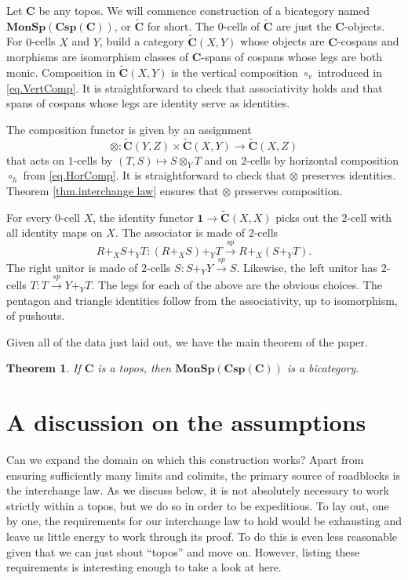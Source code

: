 \documentclass[11pt]{amsart}
\newcommand{\cat}[1]{\mathbf{#1}}
\newcommand{\from}{\colon}
\renewcommand{\span}{\xrightarrow{\mathit{sp}}}
\newcommand{\csC}{\widetilde{\mathbf{C}}}
\newtheorem{thm}{Theorem}[section]
\theoremstyle{remark}
\theoremstyle{definition}
\begin{document}
Let $\cat{C}$ be any topos. We will commence construction of a bicategory named $\cat{MonSp(Csp(C))}$, or $\csC$ for short. The $0$-cells of $\csC$ are just the $\cat{C}$-objects. For $0$-cells $X$ and $Y$, build a category $\csC(X,Y)$ whose objects are $\cat{C}$-cospans and morphisms are isomorphism classes of $\cat{C}$-spans of cospans whose legs are both monic. Composition in $\csC (X,Y)$ is the vertical composition $\circ_v$ introduced in \eqref{eq.VertComp}. It is straightforward to check that associativity holds and that spans of cospans whose legs are identity serve as identities.
%
%
%
%
%
%

The composition functor is given by an assignment
\[
\otimes \from \csC(Y,Z) \times \csC(X,Y) \to \csC(X,Z)
\]
that acts on $1$-cells by $(T,S) \mapsto S \otimes_Y T$ and on $2$-cells by horizontal composition $\circ_h$ from \eqref{eq.HorComp}. It is straightforward to check that $\otimes$ preserves identities. Theorem \ref{thm.interchange law} ensures that $\otimes$ preserves composition.
%
%
%
%
%

For every $0$-cell $X$, the identity functor $\cat{1} \to \csC (X,X)$ picks out the $2$-cell with all identity maps on $X$. The associator is made of $2$-cells 
\[
R+_XS+_YT \from (R+_XS)+_YT \span R+_X(S+_YT).
\] 
The right unitor is made of $2$-cells $S \from S+_YY \span S$. Likewise, the left unitor has $2$-cells $T \from T \span Y+_YT$. The legs for each of the above are the obvious choices. The pentagon and triangle identities follow from the associativity, up to isomorphism, of pushouts. 
%
%
%
%
%

Given all of the data just laid out, we have the main theorem of the paper.

\begin{thm}
	If $\cat{C}$ is a topos, then $\cat{MonSp(Csp(C))}$ is a bicategory.
\end{thm}
%
%
%
%
%
%
%
%
\section{A discussion on the assumptions}  %
\label{sec.Disc on Assump}
%

Can we expand the domain on which this construction works? Apart from ensuring sufficiently many limits and colimits, the primary source of roadblocks is the interchange law. As we discuss below, it is not absolutely necessary to work strictly within a topos, but we do so in order to be expeditious.  To lay out, one by one, the requirements for our interchange law to hold would be exhausting and leave us little energy to work through its proof. To do this is even less reasonable given that we can just shout ``topos'' and move on.   However, listing these requirements is interesting enough to take a look at here.  
%
%
%
%
%
\end{document}

